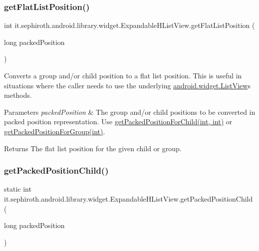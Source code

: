 \subsubsection{\texorpdfstring{get\+Flat\+List\+Position()}{getFlatListPosition()}}
{\footnotesize\ttfamily int it.\+sephiroth.\+android.\+library.\+widget.\+Expandable\+H\+List\+View.\+get\+Flat\+List\+Position (\begin{DoxyParamCaption}\item[{long}]{packed\+Position }\end{DoxyParamCaption})}

Converts a group and/or child position to a flat list position. This is useful in situations where the caller needs to use the underlying \hyperlink{}{android.\+widget.\+List\+View}\textquotesingle{}s methods.


\begin{DoxyParams}{Parameters}
{\em packed\+Position} & The group and/or child positions to be converted in packed position representation. Use \hyperlink{classit_1_1sephiroth_1_1android_1_1library_1_1widget_1_1_expandable_h_list_view_a37af0955cf4697ca1af59fbceff91fda}{get\+Packed\+Position\+For\+Child(int, int)} or \hyperlink{classit_1_1sephiroth_1_1android_1_1library_1_1widget_1_1_expandable_h_list_view_a4a66c5a45d940fb451591d3930f4fbab}{get\+Packed\+Position\+For\+Group(int)}. \\
\hline
\end{DoxyParams}
\begin{DoxyReturn}{Returns}
The flat list position for the given child or group. 
\end{DoxyReturn}
\mbox{\label{classit_1_1sephiroth_1_1android_1_1library_1_1widget_1_1_expandable_h_list_view_a9325b28ae11af4325839c0a15e640152}} 
\subsubsection{\texorpdfstring{get\+Packed\+Position\+Child()}{getPackedPositionChild()}}
{\footnotesize\ttfamily static int it.\+sephiroth.\+android.\+library.\+widget.\+Expandable\+H\+List\+View.\+get\+Packed\+Position\+Child (\begin{DoxyParamCaption}\item[{long}]{packed\+Position }\end{DoxyParamCaption})\hspace{0.3cm}{\ttfamily [static]}}

